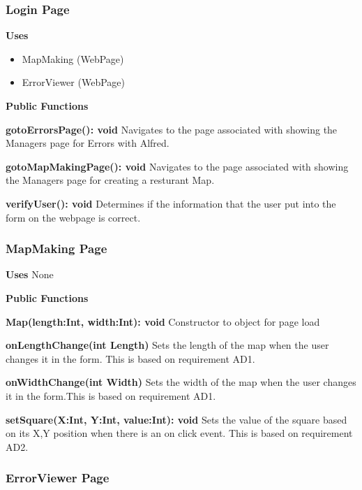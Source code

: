 \documentclass [10pt]{article}
\begin{document}

\subsubsection{Login Page}

\textbf{Uses}
\begin{itemize}
	\item MapMaking (WebPage)
	\item ErrorViewer (WebPage)
\end{itemize}


\pagebreak 


\textbf{Public Functions}

\textbf{gotoErrorsPage(): void}
Navigates to the page associated with showing the Managers page for Errors with Alfred.

\textbf{gotoMapMakingPage(): void}
Navigates to the page associated with showing the Managers page for creating a resturant Map.

\textbf{verifyUser(): void}
Determines if the information that the user put into the form on the webpage is correct.


\subsubsection{MapMaking Page}
\textbf{Uses}
None

\textbf{Public Functions}

\textbf{ Map(length:Int, width:Int): void}
Constructor to object for page load

\textbf{onLengthChange(int Length)}
Sets the length of the map when the user changes it in the form. This is based on requirement AD1.

\textbf{onWidthChange(int Width)}
Sets the width of the map when the user changes it in the form.This is based on requirement AD1.

\textbf{setSquare(X:Int, Y:Int, value:Int): void}
Sets the value of the square based on its X,Y position when there is an on click event. This is based on requirement AD2.


\subsubsection{ErrorViewer Page}
\end{document}

